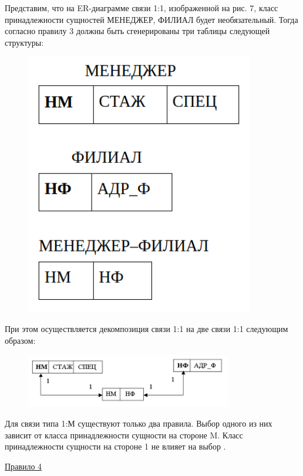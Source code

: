\begin{enumerate}
    Представим, что на ER-диаграмме связи 1:1, изображенной на рис. 7, класс принадлежности сущностей МЕНЕДЖЕР,
    ФИЛИАЛ будет необязательный. Тогда согласно правилу 3 должны быть сгенерированы три таблицы следующей структуры:

    \begin{figure}[H]
        \centering
        \includegraphics[width=100mm]{assets/security/pic7.png}
        \label{fig:mesh09}
    \end{figure}

    При этом осуществляется декомпозиция связи 1:1 на две связи 1:1 следующим образом:

    \begin{figure}[H]
        \centering
        \includegraphics[width=0.8\textwidth]{assets/security/pic8.png}
        \label{fig:mesh10}
    \end{figure}

    Для связи типа 1:М существуют только два правила. Выбор одного из них зависит от класса принадлежности
    сущности на стороне M. Класс принадлежности сущности на стороне 1 не влияет на выбор \autocite{design_db_4}.

    \underline{Правило 4}


\end{enumerate}
